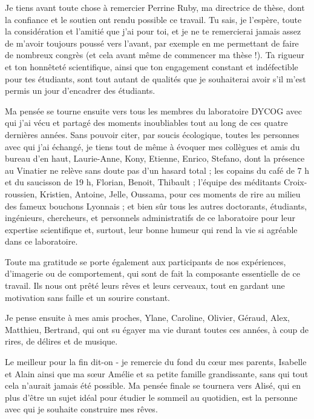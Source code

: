 \label{sec:acknowledgement}
\vspace*{-10mm}

Je tiens avant toute chose à remercier Perrine Ruby, ma directrice de thèse, dont la confiance et le soutien ont rendu possible ce travail. Tu sais, je l'espère, toute la considération et l'amitié que j'ai pour toi, et je ne te remercierai jamais assez de m'avoir toujours poussé vers l'avant, par exemple en me permettant de faire de nombreux congrès (et cela avant même de commencer ma thèse !). Ta rigueur et ton honnêteté scientifique, ainsi que ton engagement constant et indéfectible pour tes étudiants, sont tout autant de qualités que je souhaiterai avoir s'il m'est permis un jour d'encadrer des étudiants.

Ma pensée se tourne ensuite vers tous les membres du laboratoire DYCOG avec qui j’ai vécu et partagé des moments inoubliables tout au long de ces quatre dernières années. Sans pouvoir citer, par soucis écologique, toutes les personnes avec qui j’ai échangé, je tiens tout de même à évoquer mes collègues et amis du bureau d’en haut, Laurie-Anne, Kony, Etienne, Enrico, Stefano, dont la présence au Vinatier ne relève sans doute pas d’un hasard total ; les copains du café de 7 h et du saucisson de 19 h, Florian, Benoit, Thibault ; l’équipe des méditants Croix-roussien, Kristien, Antoine, Jelle, Oussama, pour ces moments de rire au milieu des fameux bouchons Lyonnais ; et bien sûr tous les autres doctorants, étudiants, ingénieurs, chercheurs, et personnels administratifs de ce laboratoire pour leur expertise scientifique et, surtout, leur bonne humeur qui rend la vie si agréable dans ce laboratoire.

Toute ma gratitude se porte également aux participants de nos expériences, d’imagerie ou de comportement, qui sont de fait la composante essentielle de ce travail. Ils nous ont prêté leurs rêves et leurs cerveaux, tout en gardant une motivation sans faille et un sourire constant.

Je pense ensuite à mes amis proches, Ylane, Caroline, Olivier, Géraud, Alex, Matthieu, Bertrand, qui ont su égayer ma vie durant toutes ces années, à coup de rires, de délires et de musique.

Le meilleur pour la fin dit-on - je remercie du fond du cœur mes parents, Isabelle et Alain ainsi que ma sœur Amélie et sa petite famille grandissante, sans qui tout cela n'aurait jamais été possible. Ma pensée finale se tournera vers Alisé, qui en plus d’être un sujet idéal pour étudier le sommeil au quotidien, est la personne avec qui je souhaite construire mes rêves.
